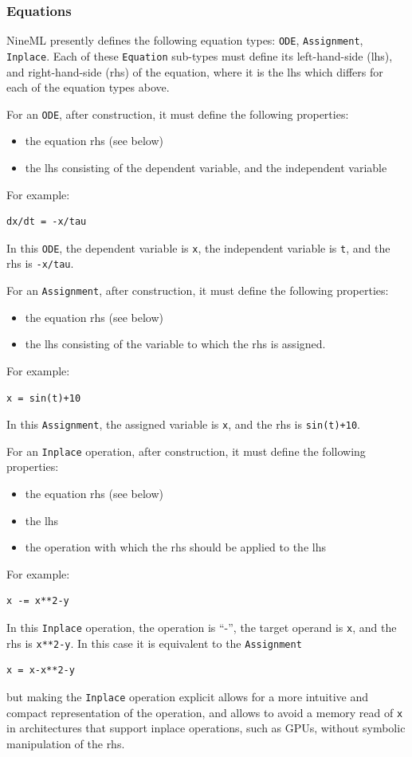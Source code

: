 \documentclass[a4paper]{article}
\newcommand\nmlClass[1]{{\tt #1}}
\begin{document}
\subsubsection{Equations}

NineML presently defines the following equation types: \nmlClass{ODE},
\nmlClass{Assignment}, \nmlClass{Inplace}.  Each of these \nmlClass{Equation} sub-types must define its
left-hand-side (lhs), and right-hand-side (rhs) of the equation, where
it is the lhs which differs for each of the equation types above.

For an \nmlClass{ODE}, after construction, it must define the following properties:
\begin{itemize}
\item the equation rhs (see below)
\item the lhs consisting of the dependent variable, and the independent variable
\end{itemize} 
For example:
\begin{lstlisting}[style=display]
dx/dt = -x/tau
\end{lstlisting}
In this \nmlClass{ODE}, the dependent variable is \verb^x^, the independent
variable is \verb^t^, and the rhs is \verb^-x/tau^.

For an \nmlClass{Assignment}, after construction, it must define the following properties:
\begin{itemize}
\item the equation rhs (see below)
\item the lhs consisting of the variable to which the rhs is assigned.
\end{itemize}
For example:
\begin{lstlisting}[style=display]
x = sin(t)+10
\end{lstlisting}
In this \nmlClass{Assignment}, the assigned variable is \verb^x^, and the rhs is \verb^sin(t)+10^.

For an \nmlClass{Inplace} operation, after construction, it must define the following properties:
\begin{itemize}
\item the equation rhs (see below)
\item the lhs
\item the operation with which the rhs should be applied to the lhs
\end{itemize}
For example:
\begin{lstlisting}[style=display]
x -= x**2-y
\end{lstlisting}
In this \nmlClass{Inplace} operation, the operation is ``-'', the target operand
is \verb^x^, and the rhs is \verb^x**2-y^.  In this case it is
equivalent to the \nmlClass{Assignment}
\begin{lstlisting}[style=display]
x = x-x**2-y
\end{lstlisting}
but making the \nmlClass{Inplace} operation explicit allows for a more intuitive
and compact representation of the operation, and allows to avoid a
memory read of \verb^x^ in architectures that support inplace
operations, such as GPUs, without symbolic manipulation of the rhs.
\end{document}
